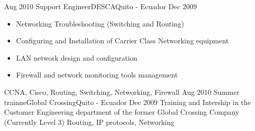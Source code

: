 \begin{experiences}
  \emptySeparator         
  \experience
  {Aug 2010}  {Support Engineer}{DESCA}{Quito - Ecuador}
  {Dec 2009}   {
                      \begin{itemize}
                        \item Networking Troubleshooting (Switching and Routing)
                        \item Configuring and Installation of Carrier Class Networking equipment
                        \item LAN network design and configuration
                        \item Firewall and network monitoring tools management
                      \end{itemize}
                }
                  {CCNA, Cisco, Routing, Switching, Networking, Firewall} 
  \emptySeparator         
  \experience
  {Aug 2010}  {Summer trainne}{Global Crossing}{Quito - Ecuador}
  {Dec 2009}   {
                Training and Intership in the Customer Engineering department of the former Global Crossing Company (Currently Level 3)
                }
                  {Routing, IP protocols, Networking} 
\end{experiences}


